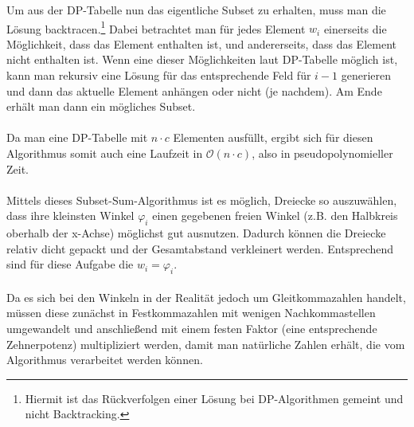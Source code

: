 \documentclass[a4paper, notitlepage, 12pt,headinclude]{scrartcl}
\begin{document}
  Um aus der DP-Tabelle nun das eigentliche Subset zu erhalten, muss man die Lösung backtracen.\footnote{Hiermit ist das Rückverfolgen einer Lösung bei DP-Algorithmen gemeint und nicht Backtracking.}\cite{Src:dpbacktrace} Dabei betrachtet man für jedes Element $w_i$ einerseits die Möglichkeit, dass das Element enthalten ist, und andererseits, dass das Element nicht enthalten ist. Wenn eine dieser Möglichkeiten laut DP-Tabelle möglich ist, kann man rekursiv eine Lösung für das entsprechende Feld für $i-1$ generieren und dann das aktuelle Element anhängen oder nicht (je nachdem). Am Ende erhält man dann ein mögliches Subset.
  \\ \\
  Da man eine DP-Tabelle mit $n \cdot c$ Elementen ausfüllt, ergibt sich für diesen Algorithmus somit auch eine Laufzeit in $\mathcal{O}(n \cdot c)$, also in pseudopolynomieller Zeit.
  \\ \\
  Mittels dieses Subset-Sum-Algorithmus ist es möglich, Dreiecke so auszuwählen, dass ihre kleinsten Winkel $\varphi_i$ einen gegebenen freien Winkel (z.B. den Halbkreis oberhalb der x-Achse) möglichst gut ausnutzen. Dadurch können die Dreiecke relativ dicht gepackt und der Gesamtabstand verkleinert werden. Entsprechend sind für diese Aufgabe die $w_i = \varphi_i$. \\ \\
   Da es sich bei den Winkeln in der Realität jedoch um Gleitkommazahlen handelt, müssen diese zunächst in Festkommazahlen mit wenigen Nachkommastellen umgewandelt und anschließend mit einem festen Faktor (eine entsprechende Zehnerpotenz) multipliziert werden, damit man natürliche Zahlen erhält, die vom Algorithmus verarbeitet werden können.
\end{document}
